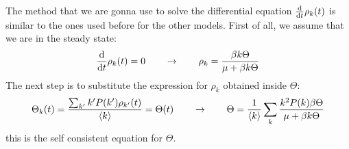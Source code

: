 \documentclass[../main/main.tex]{subfiles}
\begin{document}
The method that we are gonna use to solve the differential equation \( \dv{}{t} \rho _k (t) \) is similar to the ones used before for the other models. First of all, we assume that we are in the steady state:
\begin{equation*}
  \dv{}{t} \rho _k (t) = 0 \qquad \rightarrow  \qquad \rho _k = \frac{\beta k \Theta }{\mu + \beta k \Theta }
\end{equation*}
The next step is to substitute the expression for \( \rho _k  \) obtained inside \( \Theta  \):
\begin{equation*}
    \Theta _k (t) = \frac{\sum_{k'}^{} k' P(k') \rho _{k'} (t)  }{\expval{k} } = \Theta (t) \qquad \rightarrow \qquad \Theta = \frac{1}{\expval{k} } \sum_{k}^{} \frac{k^2 P(k) \beta \Theta }{\mu + \beta k \Theta }
\end{equation*}
this is the self consistent equation for \( \Theta  \).
\end{document}
